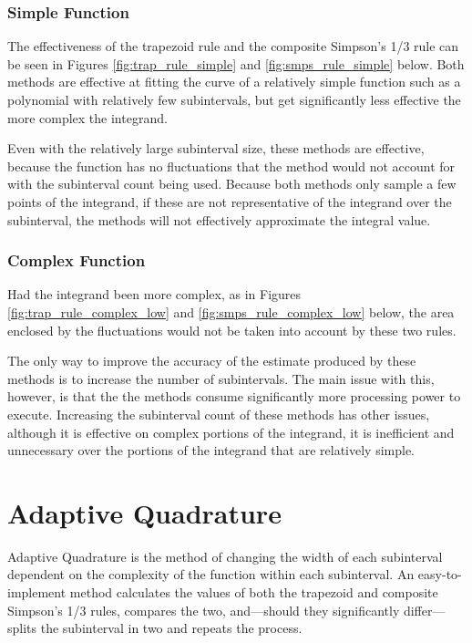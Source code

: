 \documentclass{paper}
\begin{document}
\subsubsection{Simple Function}

The effectiveness of the trapezoid rule and the composite Simpson's 1/3 rule can be seen in Figures \ref{fig:trap_rule_simple} and \ref{fig:smps_rule_simple} below.
Both methods are effective at fitting the curve of a relatively simple function such as a polynomial with relatively few subintervals, but get significantly less effective the more complex the integrand.




Even with the relatively large subinterval size, these methods are effective, because the function has no fluctuations that the method would not account for with the subinterval count being used.
Because both methods only sample a few points of the integrand, if these are not representative of the integrand over the subinterval, the methods will not effectively approximate the integral value.

\subsubsection{Complex Function}
Had the integrand been more complex, as in Figures \ref{fig:trap_rule_complex_low} and \ref{fig:smps_rule_complex_low} below, the area enclosed by the fluctuations would not be taken into account by these two rules.




The only way to improve the accuracy of the estimate produced by these methods is to increase the number of subintervals.
The main issue with this, however, is that the the methods consume significantly more processing power to execute.
Increasing the subinterval count of these methods has other issues, although it is effective on complex portions of the integrand, it is inefficient and unnecessary over the portions of the integrand that are relatively simple.

\section{Adaptive Quadrature}
Adaptive Quadrature is the method of changing the width of each subinterval dependent on the complexity of the function within each subinterval.
An easy-to-implement method calculates the values of both the trapezoid and composite Simpson's 1/3 rules, compares the two, and---should they significantly differ---splits the subinterval in two and repeats the process.%
\end{document}
